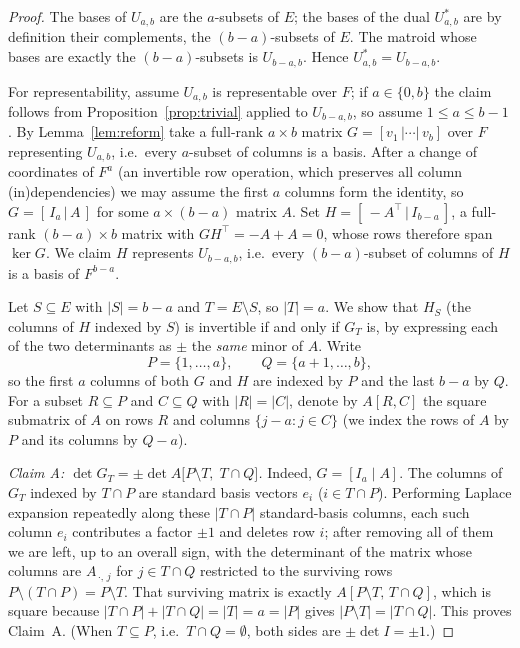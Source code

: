 \documentclass{amsart}
\theoremstyle{definition}
\begin{document}
\begin{proof}
The bases of $U_{a,b}$ are the $a$-subsets of $E$; the bases of the dual
$U_{a,b}^{*}$ are by definition their complements, the $(b-a)$-subsets of $E$.
The matroid whose bases are exactly the $(b-a)$-subsets is $U_{b-a,b}$. Hence
$U_{a,b}^{*}=U_{b-a,b}$.

For representability, assume $U_{a,b}$ is representable over $F$; if $a\in\{0,b\}$
the claim follows from Proposition~\ref{prop:trivial} applied to $U_{b-a,b}$, so
assume $1\le a\le b-1$. By Lemma~\ref{lem:reform} take a full-rank $a\times b$
matrix $G=[v_1\,|\cdots|\,v_b]$ over $F$ representing $U_{a,b}$, i.e.\ every
$a$-subset of columns is a basis. After a change of coordinates of $F^a$
(an invertible row operation, which preserves all column (in)dependencies) we may
assume the first $a$ columns form the identity, so $G=[\,I_a\,|\,A\,]$ for some
$a\times(b-a)$ matrix $A$. Set $H=[\,-A^{\top}\,|\,I_{b-a}\,]$, a full-rank
$(b-a)\times b$ matrix with $GH^{\top}=-A+A=0$, whose rows therefore span
$\ker G$. We claim $H$ represents $U_{b-a,b}$, i.e.\ every $(b-a)$-subset of
columns of $H$ is a basis of $F^{b-a}$.

Let $S\subseteq E$ with $|S|=b-a$ and $T=E\setminus S$, so $|T|=a$. We show
that $H_S$ (the columns of $H$ indexed by $S$) is invertible if and only if
$G_T$ is, by expressing each of the two determinants as $\pm$ the \emph{same}
minor of $A$. Write
\[
P=\{1,\dots,a\},\qquad Q=\{a+1,\dots,b\},
\]
so the first $a$ columns of both $G$ and $H$ are indexed by $P$ and the last
$b-a$ by $Q$. For a subset $R\subseteq P$ and $C\subseteq Q$ with $|R|=|C|$,
denote by $A[R,C]$ the square submatrix of $A$ on rows $R$ and columns
$\{j-a:j\in C\}$ (we index the rows of $A$ by $P$ and its columns by $Q-a$).

\smallskip\noindent\emph{Claim A: $\det G_T=\pm\det A\bigl[P\setminus T,\;T\cap
Q\bigr]$.} Indeed, $G=[I_a\mid A]$. The columns of $G_T$ indexed by $T\cap P$
are standard basis vectors $e_i$ ($i\in T\cap P$). Performing Laplace expansion
repeatedly along these $|T\cap P|$ standard-basis columns, each such column $e_i$
contributes a factor $\pm1$ and deletes row $i$; after removing all of them we
are left, up to an overall sign, with the determinant of the matrix whose columns
are $A_{\,\cdot,\,j}$ for $j\in T\cap Q$ restricted to the surviving rows
$P\setminus(T\cap P)=P\setminus T$. That surviving matrix is exactly
$A[P\setminus T,\,T\cap Q]$, which is square because
$|T\cap P|+|T\cap Q|=|T|=a=|P|$ gives $|P\setminus T|=|T\cap Q|$. This proves
Claim~A. (When $T\subseteq P$, i.e.\ $T\cap Q=\emptyset$, both sides are
$\pm\det I=\pm1$.)


\end{proof}
\end{document}
